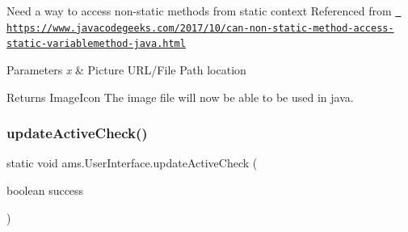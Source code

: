 Need a way to access non-\/static methods from static context Referenced from \href{https://www.javacodegeeks.com/2017/10/can-non-static-method-access-static-variablemethod-java.html}{\texttt{ https\+://www.\+javacodegeeks.\+com/2017/10/can-\/non-\/static-\/method-\/access-\/static-\/variablemethod-\/java.\+html}}


\begin{DoxyParams}{Parameters}
{\em x} & Picture U\+R\+L/\+File Path location \\
\hline
\end{DoxyParams}
\begin{DoxyReturn}{Returns}
Image\+Icon The image file will now be able to be used in java. 
\end{DoxyReturn}
\mbox{\label{classams_1_1_user_interface_a9350019300425cd33e6afa3155029ce6}} 
\subsubsection{\texorpdfstring{updateActiveCheck()}{updateActiveCheck()}}
{\footnotesize\ttfamily static void ams.\+User\+Interface.\+update\+Active\+Check (\begin{DoxyParamCaption}\item[{boolean}]{success }\end{DoxyParamCaption})\hspace{0.3cm}{\ttfamily [static]}}

